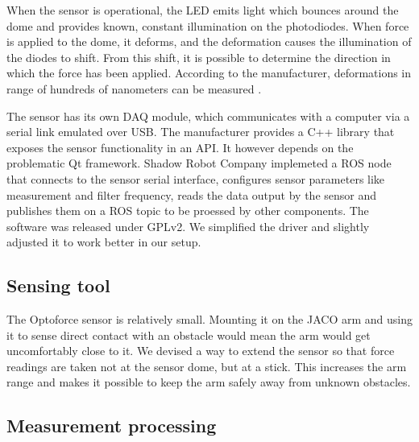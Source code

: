 \documentclass[buriama8_dp.tex]{subfiles}
\begin{document}
When the sensor is operational, the LED emits light which bounces around the dome and provides known, constant illumination on the photodiodes. When force is applied to the dome, it deforms, and the deformation causes the illumination of the diodes to shift. From this shift, it is possible to determine the direction in which the force has been applied. According to the manufacturer, deformations in range of hundreds of nanometers can be measured \cite{opto_whitep}.

The sensor has its own DAQ module, which communicates with a computer via a serial link emulated over USB. The manufacturer provides a C++ library that exposes the sensor functionality in an API. It however depends on the problematic Qt framework. Shadow Robot Company \cite{opto_driver}  implemeted a ROS node that connects to the sensor serial interface, configures sensor parameters like measurement and filter frequency, reads the data output by the sensor and publishes them on a ROS topic to be proessed by other components. The software was released under GPLv2. We simplified the driver and slightly adjusted it to work better in our setup.

\subsection{Sensing tool}
\label{subsec:sense_tool}

The Optoforce sensor is relatively small. Mounting it on the JACO arm and using it to sense direct contact with an obstacle would mean the arm would get uncomfortably close to it. We devised a way to extend the sensor so that force readings are taken not at the sensor dome, but at a stick. This increases the arm range and makes it possible to keep the arm safely away from unknown obstacles.




\subsection{Measurement processing}
\label{subsec:opto_process}
\end{document}
